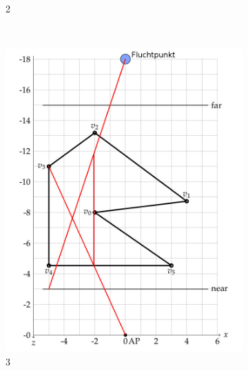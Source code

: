 \documentclass[a4paper,10pt,DIV=14]{article}
\begin{document}
\begin{figure}[H]
\begin{subfigure}{0.3\textwidth}
		\caption{2}
	\end{subfigure}
	~
	\begin{subfigure}{0.3\textwidth}
		\includegraphics[width=\textwidth]{2b_3}
		\caption{3}
	\end{subfigure}
	~
	\begin{subfigure}{0.3\textwidth}

\end{subfigure}
\end{figure}
\end{document}
